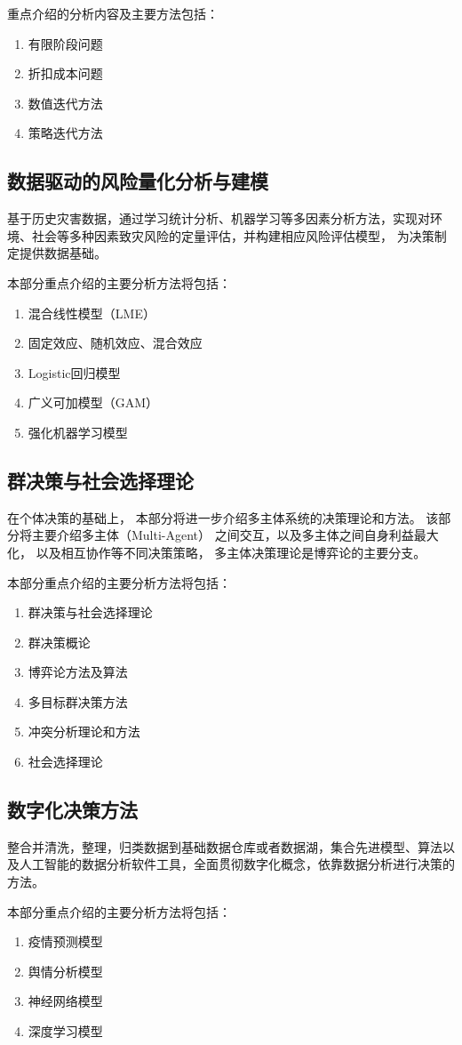 重点介绍的分析内容及主要方法包括：

\begin{enumerate}[itemsep=0pt,parsep=0pt]
    \item 有限阶段问题
    \item 折扣成本问题
    \item 数值迭代方法
    \item 策略迭代方法
\end{enumerate}

\subsection{数据驱动的风险量化分析与建模}

基于历史灾害数据，通过学习统计分析、机器学习等多因素分析方法，实现对环境、社会等多种因素致灾风险的定量评估，并构建相应风险评估模型， 为决策制定提供数据基础。

本部分重点介绍的主要分析方法将包括：

\begin{enumerate}[itemsep=0pt,parsep=0pt]
    \item 混合线性模型（LME）
    \item 固定效应、随机效应、混合效应
    \item Logistic回归模型
    \item 广义可加模型（GAM）
    \item 强化机器学习模型
\end{enumerate}

\subsection{群决策与社会选择理论}

在个体决策的基础上， 本部分将进一步介绍多主体系统的决策理论和方法。 该部分将主要介绍多主体（Multi-Agent） 之间交互，以及多主体之间自身利益最大化， 以及相互协作等不同决策策略， 多主体决策理论是博弈论的主要分支。

本部分重点介绍的主要分析方法将包括：

\begin{enumerate}[itemsep=0pt,parsep=0pt]
    \item 群决策与社会选择理论
    \item 群决策概论
    \item 博弈论方法及算法
    \item 多目标群决策方法
    \item 冲突分析理论和方法
    \item 社会选择理论
\end{enumerate}

\subsection{数字化决策方法}

整合并清洗，整理，归类数据到基础数据仓库或者数据湖，集合先进模型、算法以及人工智能的数据分析软件工具，全面贯彻数字化概念，依靠数据分析进行决策的方法。

本部分重点介绍的主要分析方法将包括：

\begin{enumerate}[itemsep=0pt,parsep=0pt]
    \item 疫情预测模型
    \item 舆情分析模型
    \item 神经网络模型
    \item 深度学习模型
\end{enumerate}